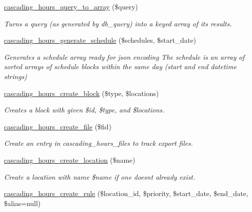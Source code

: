 \begin{DoxyCompactItemize}
\hyperlink{cascading__hours_8module_a249be7c48243cb163d83f3ac8c89813f_a249be7c48243cb163d83f3ac8c89813f}{cascading\+\_\+hours\+\_\+query\+\_\+to\+\_\+array} (\$query)
\begin{DoxyCompactList}\small\item\em Turns a query (as generated by db\+\_\+query) into a keyed array of its results. \end{DoxyCompactList}\item 
\hyperlink{cascading__hours_8module_aad69670d192753a4e14ef0504de71a13_aad69670d192753a4e14ef0504de71a13}{cascading\+\_\+hours\+\_\+generate\+\_\+schedule} (\$schedules, \$start\+\_\+date)
\begin{DoxyCompactList}\small\item\em Generates a schedule array ready for json encoding The schedule is an array of sorted arrays of schedule blocks within the same day (start and end datetime strings) \end{DoxyCompactList}\item 
\hyperlink{cascading__hours_8module_aecc88103b29ba98defaf874cdb56343b_aecc88103b29ba98defaf874cdb56343b}{cascading\+\_\+hours\+\_\+create\+\_\+block} (\$type, \$locations)
\begin{DoxyCompactList}\small\item\em Creates a block with given \$id, \$type, and \$locations. \end{DoxyCompactList}\item 
\hyperlink{cascading__hours_8module_a534f85a8b3146f2b42ec33669333ad86_a534f85a8b3146f2b42ec33669333ad86}{cascading\+\_\+hours\+\_\+create\+\_\+file} (\$fid)
\begin{DoxyCompactList}\small\item\em Create an entry in cascading\+\_\+hours\+\_\+files to track export files. \end{DoxyCompactList}\item 
\hyperlink{cascading__hours_8module_a7f2df49e7c04411f74138cc54e196fea_a7f2df49e7c04411f74138cc54e196fea}{cascading\+\_\+hours\+\_\+create\+\_\+location} (\$name)
\begin{DoxyCompactList}\small\item\em Create a location with name \$name if one doesn\textquotesingle{}t already exist. \end{DoxyCompactList}\item 
\hyperlink{cascading__hours_8module_a24a585afee47ad45417aa6d2b56cf64d_a24a585afee47ad45417aa6d2b56cf64d}{cascading\+\_\+hours\+\_\+create\+\_\+rule} (\$location\+\_\+id, \$priority, \$start\+\_\+date, \$end\+\_\+date, \$alias=null)

\end{DoxyCompactItemize}
